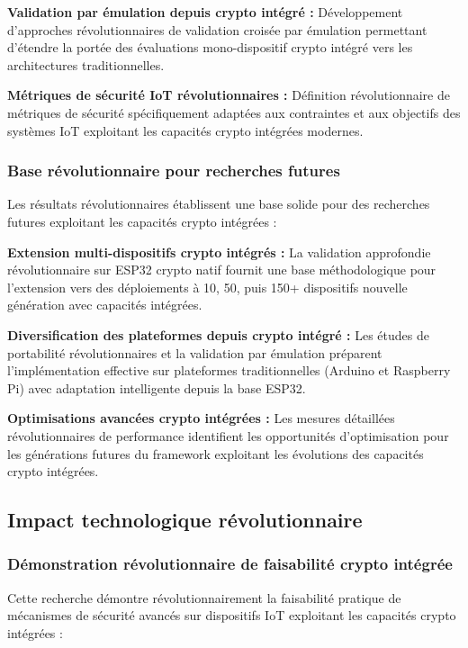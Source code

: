 \textbf{Validation par émulation depuis crypto intégré :} Développement d'approches révolutionnaires de validation croisée par émulation permettant d'étendre la portée des évaluations mono-dispositif crypto intégré vers les architectures traditionnelles.

\textbf{Métriques de sécurité IoT révolutionnaires :} Définition révolutionnaire de métriques de sécurité spécifiquement adaptées aux contraintes et aux objectifs des systèmes IoT exploitant les capacités crypto intégrées modernes.

\subsubsection{Base révolutionnaire pour recherches futures}

Les résultats révolutionnaires établissent une base solide pour des recherches futures exploitant les capacités crypto intégrées :

\textbf{Extension multi-dispositifs crypto intégrés :} La validation approfondie révolutionnaire sur ESP32 crypto natif fournit une base méthodologique pour l'extension vers des déploiements à 10, 50, puis 150+ dispositifs nouvelle génération avec capacités intégrées.

\textbf{Diversification des plateformes depuis crypto intégré :} Les études de portabilité révolutionnaires et la validation par émulation préparent l'implémentation effective sur plateformes traditionnelles (Arduino et Raspberry Pi) avec adaptation intelligente depuis la base ESP32.

\textbf{Optimisations avancées crypto intégrées :} Les mesures détaillées révolutionnaires de performance identifient les opportunités d'optimisation pour les générations futures du framework exploitant les évolutions des capacités crypto intégrées.

\subsection{Impact technologique révolutionnaire}

\subsubsection{Démonstration révolutionnaire de faisabilité crypto intégrée}

Cette recherche démontre révolutionnairement la faisabilité pratique de mécanismes de sécurité avancés sur dispositifs IoT exploitant les capacités crypto intégrées :


